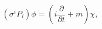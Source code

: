 \begin{equation}
\label{4}\left( \sigma ^iP_i\right) \phi =\left( i\frac \partial {\partial
t}+m\right) \chi , 
\end{equation}

